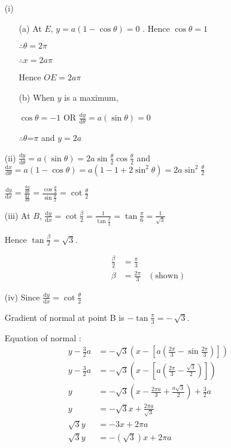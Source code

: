 \item {}
\begin{enumerate}
\item[(i)]  {}
\begin{enumerate}
\item[(a)]  At $E$, $y=a(1-\cos\theta)=0$ . Hence $\cos\theta=1\text{ }$ 

$\therefore\theta=\text{2}\pi$

$\therefore x=2a\pi$

Hence $OE=2a\pi$
\item[(b)]  When $y$ is a maximum, 

$\cos\theta=-1$ OR $\frac{\text{d}y}{\text{d}\theta}=a(\sin\theta)=0\text{ }$

$\therefore\theta\text{=}\pi$ and $y=2a$
\end{enumerate}
\item[(ii)]  $\frac{\text{d}y}{\text{d}\theta}=a(\sin\theta)=2a\sin\frac{\theta}{2}\cos\frac{\theta}{2}$
and $\frac{\text{d}x}{\text{d}\theta}=a(1-\cos\theta)=a(1-1+2\sin^{2}\theta)=2a\sin^{2}\frac{\theta}{2}$ 

$\frac{\text{d}y}{\text{d}x}=\frac{\frac{\text{d}y}{\text{d}\theta}}{\frac{\text{d}x}{\text{d}\theta}}=\frac{\cos\frac{\theta}{2}}{\sin\frac{\theta}{2}}=\cot\frac{\theta}{2}$
\item[(iii)]  At $B$, $\frac{\text{d}y}{\text{d}x}=\cot\frac{\beta}{2}=\frac{1}{\tan\frac{\beta}{2}}=\tan\frac{\pi}{6}=\frac{1}{\sqrt{3}}$ 

Hence $\tan\frac{\beta}{2}=\sqrt{3}$. 

\begin{align*}
\frac{\beta}{2} & =\frac{\pi}{3}\\
\beta & =\frac{2\pi}{3} & (\text{shown})
\end{align*}

\item[(iv)]  Since $\frac{\text{d}y}{\text{d}x}=\cot\frac{\theta}{2}$ 

Gradient of normal at point B is $-\tan\frac{\pi}{3}=-\,\sqrt{3}$. 

Equation of normal : 
\begin{align*}
y-\frac{3}{2}a & =-\sqrt{3}\left(x-\left[a\left(\frac{2\pi}{3}-\sin\frac{2\pi}{3}\right)\right]\right)\\
y-\frac{3}{2}a & =-\sqrt{3}\left(x-\left[a\left(\frac{2\pi}{3}-\frac{\sqrt{3}}{2}\right)\right]\right)\\
y & =-\sqrt{3}\left(x-\frac{2\pi a}{3}+\frac{a\sqrt{3}}{2}\right)+\frac{3}{2}a\\
y & =-\sqrt{3}x+\frac{2\pi a}{\sqrt{3}}\\
\sqrt{3}y & =-3x+2\pi a\\
\sqrt{3}y & =-\left(\sqrt{3}\right)x+2\pi a
\end{align*}

\end{enumerate}